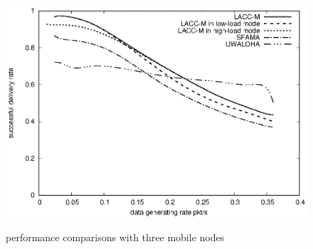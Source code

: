 \documentclass[conference]{IEEEtran}
\begin{document}
\begin{figure}[!h]
	{                    \begin{minipage}{7cm}\centering                                      \includegraphics[scale=0.5]{figures/3nodec.eps} 
	\label{33}
	\end{minipage}
	}
	
	\caption{performance comparisons with three mobile nodes}    
    \label{fig:2}                                                 
\end{figure}                                                 
\end{document}
